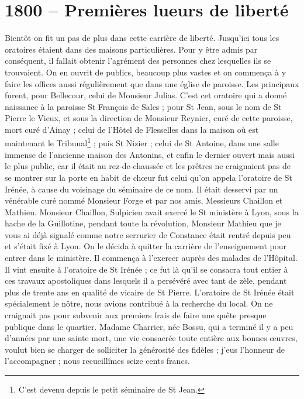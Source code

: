 \documentclass[11pt,a4paper]{report}
\begin{document}
\section*{1800 -- Premières lueurs de liberté}

Bientôt on fit un pas de plus dans cette carrière de liberté. Jusqu'ici tous les oratoires étaient dans des maisons particulières. Pour y être admis par conséquent, il fallait obtenir l'agrément des personnes chez lesquelles ils se trouvaient. On en ouvrit de publics, beaucoup plus vastes et on commença à y faire les offices aussi régulièrement que dans une église de paroisse. Les principaux furent, pour Bellecour, celui de Monsieur Julias. C'est cet oratoire qui a donné naissance à la paroisse St François de Sales ; pour St Jean, sous le nom de St Pierre le Vieux, et sous la direction de Monsieur Reynier, curé de cette paroisse, mort curé d'Ainay ; celui de l'Hôtel de Flesselles dans la maison où est maintenant le Tribunal\footnote{C'est devenu depuis le petit séminaire de St Jean.} ; puis St Nizier ; celui de St Antoine, dans une salle immense de l'ancienne maison des Antonins, et enfin le dernier ouvert mais aussi le plus public, car il était au rez-de-chaussée et les prêtres ne craignaient pas de se montrer sur la porte en habit de chœur fut celui qu'on appela l'oratoire de St Irénée, à cause du voisinage du séminaire de ce nom. Il était desservi par un vénérable curé nommé Monsieur Forge et par nos amis, Messieurs Chaillon et Mathieu. Monsieur Chaillon, Sulpicien avait exercé le St ministère à Lyon, sous la hache de la Guillotine, pendant toute la révolution, Monsieur Mathieu que je vous ai déjà signalé comme notre serrurier de Constance était rentré depuis peu et s'était fixé à Lyon. On le décida à quitter la carrière de l'enseignement pour entrer dans le ministère. Il commença à l'exercer auprès des malades de l'Hôpital. Il vint ensuite à l'oratoire de St Irénée ; ce fut là qu'il se consacra tout entier à ces travaux apostoliques dans lesquels il a persévéré avec tant de zèle, pendant plus de trente ans en qualité de vicaire de St Pierre. L'oratoire de St Irénée était spécialement le nôtre, nous avions contribué à la recherche du local. On ne craignait pas pour subvenir aux premiers frais de faire une quête presque publique dans le quartier. Madame Charrier, née Bossu, qui a terminé il y a peu d'années par une sainte mort, une vie consacrée toute entière aux bonnes œuvres, voulut bien se charger de solliciter la générosité des fidèles ; j'eus l'honneur de l'accompagner ; nous recueillîmes seize cents francs.
\end{document}
